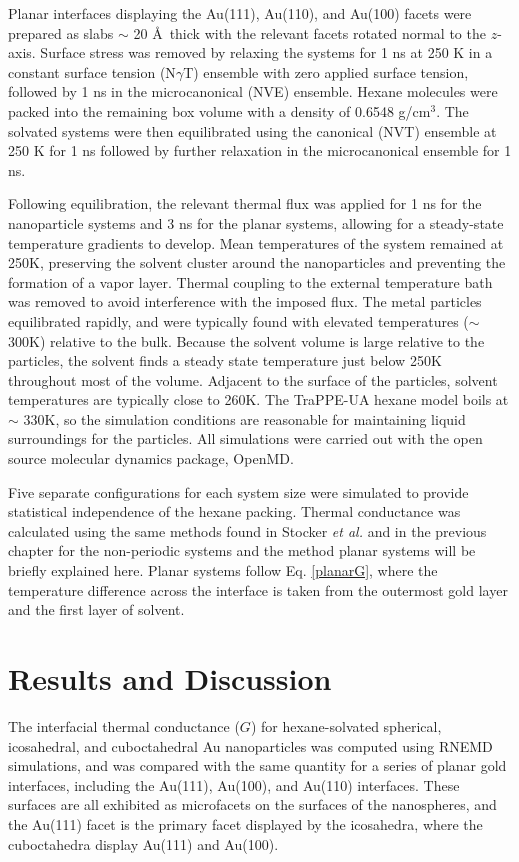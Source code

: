 Planar interfaces displaying the Au(111), Au(110), and Au(100) facets
were prepared as slabs $\sim$ 20 \AA\ thick with the relevant facets
rotated normal to the $z$-axis. Surface stress was removed by relaxing
the systems for 1 ns at 250 K in a constant surface tension
(N\(\gamma\)T) ensemble with zero applied surface tension, followed by
1 ns in the microcanonical (NVE) ensemble.  Hexane molecules were
packed into the remaining box volume with a density of 0.6548
g/cm$^3$. The solvated systems were then equilibrated using the
canonical (NVT) ensemble at 250 K for 1 ns followed by further
relaxation in the microcanonical ensemble for 1 ns.

Following equilibration, the relevant thermal flux was applied for 1
ns for the nanoparticle systems and 3 ns for the planar systems,
allowing for a steady-state temperature gradients to develop. Mean
temperatures of the system remained at 250K, preserving the solvent
cluster around the nanoparticles and preventing the formation of a
vapor layer. Thermal coupling to the external temperature bath was
removed to avoid interference with the imposed flux. The metal
particles equilibrated rapidly, and were typically found with elevated
temperatures ($\sim$300K) relative to the bulk. Because the solvent
volume is large relative to the particles, the solvent finds a steady
state temperature just below 250K throughout most of the
volume. Adjacent to the surface of the particles, solvent temperatures
are typically close to 260K. The TraPPE-UA hexane model boils at
$\sim$ 330K, so the simulation conditions are reasonable for
maintaining liquid surroundings for the particles.  All simulations
were carried out with the open source molecular dynamics package,
OpenMD.\cite{openmd,OOPSE}

Five separate configurations for each system size were simulated to
provide statistical independence of the hexane packing.  Thermal
conductance was calculated using the same methods found in Stocker
\textit{et al.}\cite{Stocker2016} and in the previous chapter for the non-periodic systems 
and the method planar systems will be briefly explained here.
Planar systems follow Eq. \ref{planarG}, where the temperature difference across the interface is taken from the outermost gold layer and the first layer of solvent. 

\section{Results and Discussion}
The interfacial thermal conductance ($G$) for hexane-solvated
spherical, icosahedral, and cuboctahedral Au nanoparticles was
computed using RNEMD simulations, and was compared with the same
quantity for a series of planar gold interfaces, including the
Au(111), Au(100), and Au(110) interfaces.  These surfaces are all
exhibited as microfacets on the surfaces of the nanospheres, and the
Au(111) facet is the primary facet displayed by the icosahedra,
where the cuboctahedra display Au(111) and Au(100).


